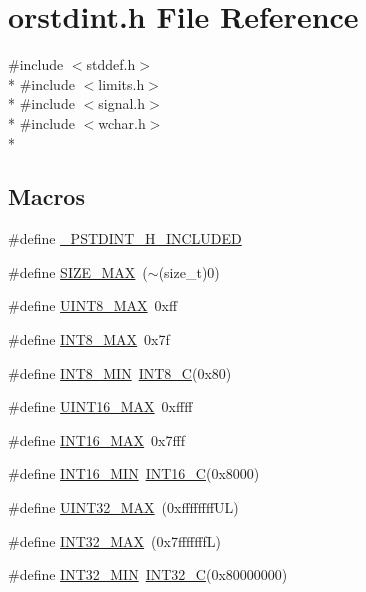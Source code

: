 \section{orstdint.\-h File Reference}
\label{orstdint_8h}
{\ttfamily \#include $<$stddef.\-h$>$}\\*
{\ttfamily \#include $<$limits.\-h$>$}\\*
{\ttfamily \#include $<$signal.\-h$>$}\\*
{\ttfamily \#include $<$wchar.\-h$>$}\\*
\subsection*{Macros}
\begin{DoxyCompactItemize}
\item 
\#define \hyperlink{orstdint_8h_a91cbfa927fe8e3fc657296bfe67849a6}{\-\_\-\-P\-S\-T\-D\-I\-N\-T\-\_\-\-H\-\_\-\-I\-N\-C\-L\-U\-D\-E\-D}
\item 
\#define \hyperlink{orstdint_8h_a3c75bb398badb69c7577b21486f9963f}{S\-I\-Z\-E\-\_\-\-M\-A\-X}~($\sim$(size\-\_\-t)0)
\item 
\#define \hyperlink{orstdint_8h_aeb4e270a084ee26fe73e799861bd0252}{U\-I\-N\-T8\-\_\-\-M\-A\-X}~0xff
\item 
\#define \hyperlink{orstdint_8h_aaf7f29f45f1a513b4748a4e5014ddf6a}{I\-N\-T8\-\_\-\-M\-A\-X}~0x7f
\item 
\#define \hyperlink{orstdint_8h_aadcf2a81af243df333b31efa6461ab8e}{I\-N\-T8\-\_\-\-M\-I\-N}~\hyperlink{stdint_8h_a1eaa7db37089dcdfb60227725c9c1585}{I\-N\-T8\-\_\-\-C}(0x80)
\item 
\#define \hyperlink{orstdint_8h_a3ea490c9b3617d4479bd80ef93cd5602}{U\-I\-N\-T16\-\_\-\-M\-A\-X}~0xffff
\item 
\#define \hyperlink{orstdint_8h_ac58f2c111cc9989c86db2a7dc4fd84ca}{I\-N\-T16\-\_\-\-M\-A\-X}~0x7fff
\item 
\#define \hyperlink{orstdint_8h_ad4e9955955b27624963643eac448118a}{I\-N\-T16\-\_\-\-M\-I\-N}~\hyperlink{stdint_8h_a838b261fec725cb0f5d5b6769d3521e7}{I\-N\-T16\-\_\-\-C}(0x8000)
\item 
\#define \hyperlink{orstdint_8h_ab5eb23180f7cc12b7d6c04a8ec067fdd}{U\-I\-N\-T32\-\_\-\-M\-A\-X}~(0xffffffff\-U\-L)
\item 
\#define \hyperlink{orstdint_8h_a181807730d4a375f848ba139813ce04f}{I\-N\-T32\-\_\-\-M\-A\-X}~(0x7fffffff\-L)
\item 
\#define \hyperlink{orstdint_8h_a688eb21a22db27c2b2bd5836943cdcbe}{I\-N\-T32\-\_\-\-M\-I\-N}~\hyperlink{stdint_8h_ad78650fb7726f4e99205406569ef403d}{I\-N\-T32\-\_\-\-C}(0x80000000)

\end{DoxyCompactItemize}

